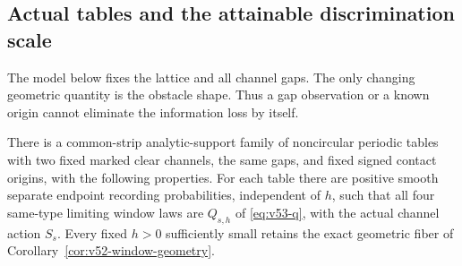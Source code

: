 \subsection{Actual tables and the attainable discrimination scale}

The model below fixes the lattice and all channel gaps.  The only changing
geometric quantity is the obstacle shape.  Thus a gap observation or a
known origin cannot eliminate the information loss by itself.

\begin{theorem}
\label{thm:v53-realized-experiment}
There is a common-strip analytic-support family of noncircular periodic
tables with two fixed marked clear channels, the same gaps, and fixed
signed contact origins, with the following properties.
For each table there are positive smooth separate endpoint recording
probabilities, independent of $h$, such that all four same-type limiting
window laws are $Q_{s,h}$ of \eqref{eq:v53-q}, with the actual channel
action $S_s$.  Every fixed $h>0$ sufficiently small retains the exact
geometric fiber of Corollary~\ref{cor:v52-window-geometry}.


\end{theorem}
